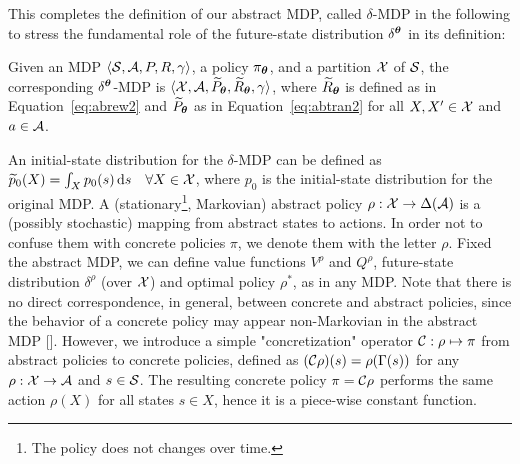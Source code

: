 This completes the definition of our abstract \ac{MDP}, called $\delta$-MDP in the following to stress the fundamental role of the future-state distribution $\delta^{\boldsymbol{\theta}}$ in its definition:
%
\begin{definition}\label{def:abmdp}
	Given an \ac{MDP} $\langle\mathcal{S}, \mathcal{A}, P, R, \gamma\rangle$, a policy $\pi_{\boldsymbol{\theta}}$, and a partition $\mathcal{X}$ of $\mathcal{S}$, the corresponding $\delta^{\boldsymbol{\theta}}$-MDP is $\langle\mathcal{X}, \mathcal{A}, \widetilde{P}_{\boldsymbol{\theta}}, \widetilde{R}_{\boldsymbol{\theta}}, \gamma\rangle$, where $\widetilde{R}_{\boldsymbol{\theta}}$ is defined as in Equation~\eqref{eq:abrew2} and $\widetilde{P}_{\boldsymbol{\theta}}$ as in Equation~\eqref{eq:abtran2} for all $X,X'\in\mathcal{X}$ and $a\in\mathcal{A}$.
\end{definition}
%
\noindent An initial-state distribution for the $\delta$-\ac{MDP} can be defined as $\widetilde{p}_0(X) = \int_{X}p_0(s)\,\mathrm{d} s\quad\forall X\in\mathcal{X}$, where $p_0$ is the initial-state distribution for the original \ac{MDP}.
%
A (stationary\footnote{The policy does not changes over time.}, Markovian) abstract policy $\rho: \mathcal{X} \to \Delta(\mathcal{A})$ is a (possibly stochastic) mapping from abstract states to actions. In order not to confuse them with concrete policies $\pi$, we denote them with the letter $\rho$. Fixed the abstract \ac{MDP}, we can define value functions $V^{\rho}$ and $Q^{\rho}$, future-state distribution $\delta^{\rho}$ (over $\mathcal{X}$) and optimal policy $\rho^{*}$, as in any \ac{MDP}. Note that there is no direct correspondence, in general, between concrete and abstract policies, since the behavior of a concrete policy may appear non-Markovian in the abstract \ac{MDP} [\cite{lihong2006towards}].
However, we introduce a simple "concretization" operator $\mathcal{C}: \rho \mapsto \pi$ from abstract policies to concrete policies, defined as
$(\mathcal{C}\rho)(s) = \rho(\Gamma(s))$
for any $\rho:\mathcal{X}\to\mathcal{A}$ and $s\in\mathcal{S}$. The resulting concrete policy $\pi = \mathcal{C}\rho$ performs the same action $\rho(X)$ for all states $s\in X$, hence it is a piece-wise constant function.

